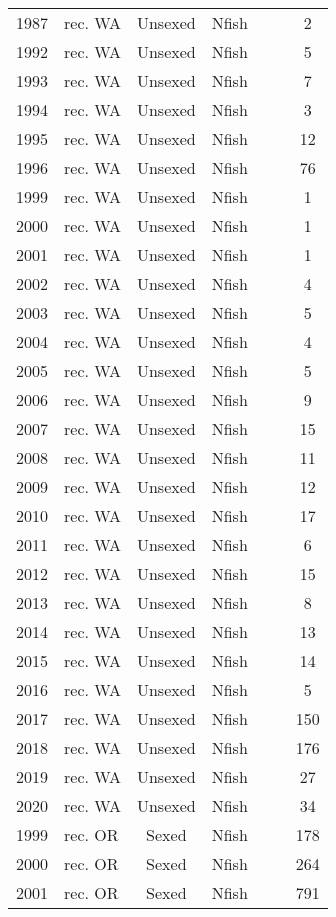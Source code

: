 \begin{longtable}[t]{c>{\centering\arraybackslash}p{3cm}ccccc}
1987 & rec. WA & Unsexed & Nfish &  &  & 2\\
1992 & rec. WA & Unsexed & Nfish &  &  & 5\\
1993 & rec. WA & Unsexed & Nfish &  &  & 7\\
1994 & rec. WA & Unsexed & Nfish &  &  & 3\\
1995 & rec. WA & Unsexed & Nfish &  &  & 12\\
1996 & rec. WA & Unsexed & Nfish &  &  & 76\\
1999 & rec. WA & Unsexed & Nfish &  &  & 1\\
2000 & rec. WA & Unsexed & Nfish &  &  & 1\\
2001 & rec. WA & Unsexed & Nfish &  &  & 1\\
2002 & rec. WA & Unsexed & Nfish &  &  & 4\\
2003 & rec. WA & Unsexed & Nfish &  &  & 5\\
2004 & rec. WA & Unsexed & Nfish &  &  & 4\\
2005 & rec. WA & Unsexed & Nfish &  &  & 5\\
2006 & rec. WA & Unsexed & Nfish &  &  & 9\\
2007 & rec. WA & Unsexed & Nfish &  &  & 15\\
2008 & rec. WA & Unsexed & Nfish &  &  & 11\\
2009 & rec. WA & Unsexed & Nfish &  &  & 12\\
2010 & rec. WA & Unsexed & Nfish &  &  & 17\\
2011 & rec. WA & Unsexed & Nfish &  &  & 6\\
2012 & rec. WA & Unsexed & Nfish &  &  & 15\\
2013 & rec. WA & Unsexed & Nfish &  &  & 8\\
2014 & rec. WA & Unsexed & Nfish &  &  & 13\\
2015 & rec. WA & Unsexed & Nfish &  &  & 14\\
2016 & rec. WA & Unsexed & Nfish &  &  & 5\\
2017 & rec. WA & Unsexed & Nfish &  &  & 150\\
2018 & rec. WA & Unsexed & Nfish &  &  & 176\\
2019 & rec. WA & Unsexed & Nfish &  &  & 27\\
2020 & rec. WA & Unsexed & Nfish &  &  & 34\\
1999 & rec. OR & Sexed & Nfish &  &  & 178\\
2000 & rec. OR & Sexed & Nfish &  &  & 264\\
2001 & rec. OR & Sexed & Nfish &  &  & 791\\

\end{longtable}
